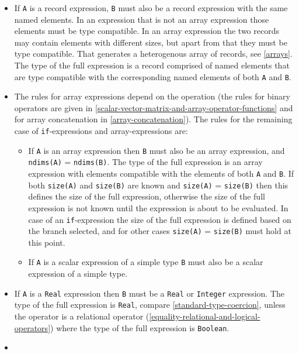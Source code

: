 \begin{itemize}
\item
  If \lstinline!A! is a record expression, \lstinline!B! must also be a record expression with the same named elements.
  In an expression that is not an array expression those elements must be type compatible.
  In an array expression the two records may contain elements with different sizes, but apart from that they must be type compatible.
  That generates a heterogenous array of records, see \cref{arrays}.
  The type of the full expression is a record comprised of named elements that are type compatible with the corresponding named elements of both \lstinline!A! and \lstinline!B!.
\item
  The rules for array expressions depend on the operation (the rules for binary operators are given in \cref{scalar-vector-matrix-and-array-operator-functions} and for array concatenation in \cref{array-concatenation}).
  The rules for the remaining case of \lstinline!if!-expressions and array-expressions are:
  \begin{itemize}
  \item
    If \lstinline!A! is an array expression then \lstinline!B! must also be an array expression, and \lstinline!ndims(A)! = \lstinline!ndims(B)!.
    The type of the full expression is an array expression with elements compatible with the elements of both \lstinline!A! and \lstinline!B!.
    If both \lstinline!size(A)! and \lstinline!size(B)! are known and \lstinline!size(A)! = \lstinline!size(B)! then this defines the size of the full expression, otherwise the size of the full expression is not known until the expression is about to be evaluated.
    In case of an \lstinline!if!-expression the size of the full expression is defined based on the branch selected, and for other cases \lstinline!size(A)! = \lstinline!size(B)! must hold at this point.
  \item
    If \lstinline!A! is a scalar expression of a simple type \lstinline!B! must also be a scalar expression of a simple type.
  \end{itemize}
\item
  If \lstinline!A! is a \lstinline!Real! expression then \lstinline!B! must be a \lstinline!Real! or \lstinline!Integer! expression.
  The type of the full expression is \lstinline!Real!, compare \cref{standard-type-coercion}, unless the operator is a relational operator (\cref{equality-relational-and-logical-operators}) where the type of the full expression is \lstinline!Boolean!.
\item

\end{itemize}
